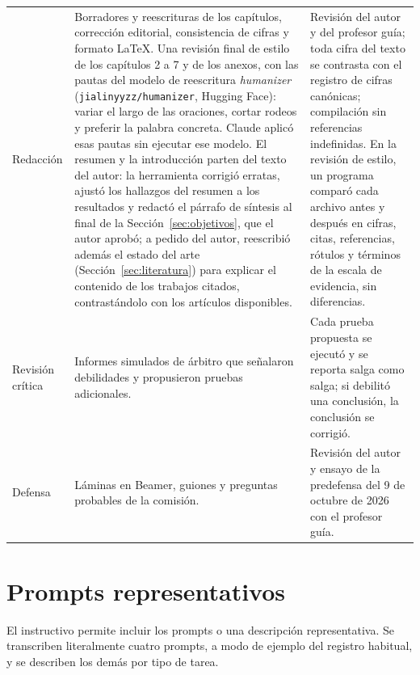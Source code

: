 \begin{small}
\begin{longtable}{>{\raggedright\arraybackslash}p{}>{\raggedright\arraybackslash}p{}>{\raggedright\arraybackslash}p{}}
Redacción & Borradores y reescrituras de los capítulos, corrección editorial, consistencia de cifras y formato \LaTeX. Una revisión final de estilo de los capítulos 2 a 7 y de los anexos, con las pautas del modelo de reescritura \textit{humanizer} (\texttt{jialinyyzz/humanizer}, Hugging Face): variar el largo de las oraciones, cortar rodeos y preferir la palabra concreta. Claude aplicó esas pautas sin ejecutar ese modelo. El resumen y la introducción parten del texto del autor: la herramienta corrigió erratas, ajustó los hallazgos del resumen a los resultados y redactó el párrafo de síntesis al final de la Sección~\ref{sec:objetivos}, que el autor aprobó; a pedido del autor, reescribió además el estado del arte (Sección~\ref{sec:literatura}) para explicar el contenido de los trabajos citados, contrastándolo con los artículos disponibles. & Revisión del autor y del profesor guía; toda cifra del texto se contrasta con el registro de cifras canónicas; compilación sin referencias indefinidas. En la revisión de estilo, un programa comparó cada archivo antes y después en cifras, citas, referencias, rótulos y términos de la escala de evidencia, sin diferencias. \\
Revisión crítica & Informes simulados de árbitro que señalaron debilidades y propusieron pruebas adicionales. & Cada prueba propuesta se ejecutó y se reporta salga como salga; si debilitó una conclusión, la conclusión se corrigió. \\
Defensa & Láminas en Beamer, guiones y preguntas probables de la comisión. & Revisión del autor y ensayo de la predefensa del 9 de octubre de 2026 con el profesor guía. \\
\end{longtable}
\end{small}

\section{Prompts representativos}

El instructivo permite incluir los prompts o una descripción representativa. Se transcriben literalmente cuatro prompts, a modo de ejemplo del registro habitual, y se describen los demás por tipo de tarea.

